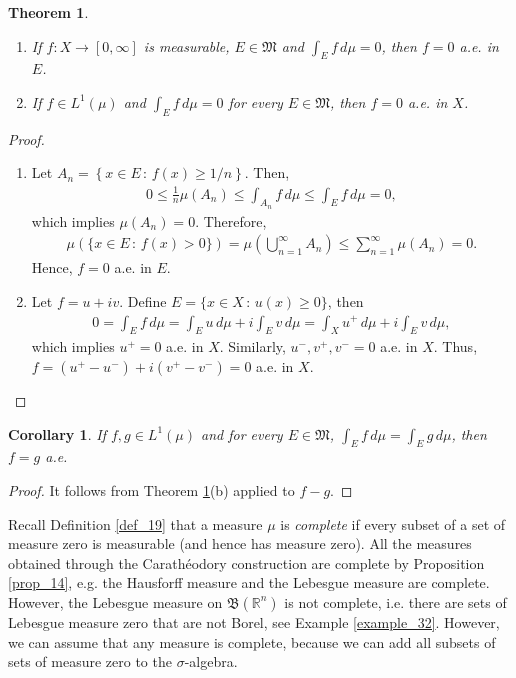 \documentclass[11pt]{book}
\newtheorem{theorem}{Theorem}[chapter]
\newtheorem{corollary}{Corollary}[theorem]
\theoremstyle{definition}
\numberwithin{equation}{chapter}
\begin{document}
\begin{theorem}\label{theorem_215}
~\begin{enumerate}[label=(\alph*)]
    \item If $f: X \to [0,\infty]$ is measurable, $E \in \mathfrak{M}$ and $\int_E f\,d\mu = 0$, then $f = 0$ a.e. in $E$.
    
    \item If $f \in L^1(\mu)$ and $\int_E f\,d\mu = 0$ for every $E \in \mathfrak{M}$, then $f = 0$ a.e. in $X$.
\end{enumerate}
\end{theorem}
\begin{proof}
~\begin{enumerate}[label=(\alph*)]
    \item Let $A_n = \left\{x \in E \,:\, f(x) \geq 1/n \right\}$. Then,
    \begin{align*}
        0 \leq \frac{1}{n} \mu(A_n) \leq \int_{A_n} f\,d\mu \leq \int_E f\,d\mu = 0,
    \end{align*}
    which implies $\mu(A_n) = 0$. Therefore,
    \begin{align*}
        \mu\left(\{x \in E \,:\, f(x) > 0 \}\right) = \mu\left(\bigcup^\infty_{n=1} A_n \right) \leq \sum^\infty_{n=1} \mu(A_n) = 0.
    \end{align*}
    Hence, $f = 0$ a.e. in $E$.
    
    \item Let $f = u + iv$. Define $E = \{x \in X \,:\, u(x) \geq 0 \}$, then 
    \begin{align*}
        0 = \int_E f\,d\mu = \int_E u\,d\mu + i \int_E v\,d\mu = \int_X u^+\,d\mu + i \int_E v\,d\mu,
    \end{align*}
    which implies $u^+ = 0$ a.e. in $X$. Similarly, $u^-, v^+, v^- = 0$ a.e. in $X$. Thus, $f = (u^+ - u^-) + i(v^+ - v^-) = 0$ a.e. in $X$.
\end{enumerate}
\end{proof}

\begin{corollary}
If $f,g \in L^1(\mu)$ and for every $E \in \mathfrak{M}$, $\int_E f\,d\mu = \int_E g\,d\mu$, then $f = g$ a.e.
\end{corollary}
\begin{proof}
It follows from Theorem \ref{theorem_215}(b) applied to $f - g$.
\end{proof}

\medskip


Recall Definition \ref{def_19} that a measure $\mu$ is {\em complete} if every subset of a set of measure zero is measurable (and hence has measure zero). All the measures obtained through the Carathéodory construction are complete by Proposition \ref{prop_14}, e.g. the Hausforff measure and the Lebesgue measure are complete. However, the Lebesgue measure on $\mathfrak{B}(\mathbb{R}^n)$ is not complete, i.e. there are sets of Lebesgue measure zero that are not Borel, see Example \ref{example_32}. However, we can assume that any measure is complete, because we can add all subsets of sets of measure zero to the $\sigma$-algebra.
\end{document}
